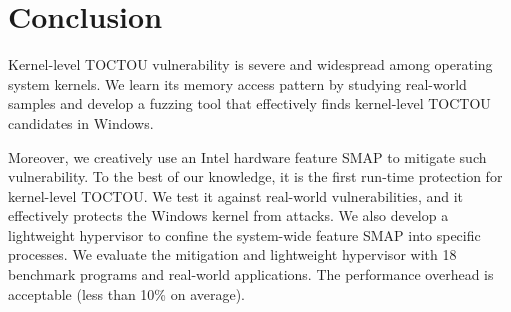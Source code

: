 \section{Conclusion}
\label{sec:ktoctou-conclusion}


Kernel-level TOCTOU vulnerability is severe and widespread among operating system kernels. We learn its memory access pattern by studying real-world samples and develop a fuzzing tool \toolname that
effectively finds kernel-level TOCTOU candidates in Windows.

Moreover, we creatively use an Intel hardware feature SMAP to mitigate such vulnerability. To the best of our knowledge, it is the first run-time protection for kernel-level TOCTOU. We test it against real-world vulnerabilities, and it effectively protects the Windows kernel from attacks. We also develop a lightweight hypervisor to confine the system-wide feature SMAP into specific processes. We evaluate the mitigation and lightweight hypervisor with 18 benchmark programs and real-world applications. The performance overhead is acceptable (less than 10\% on average).
